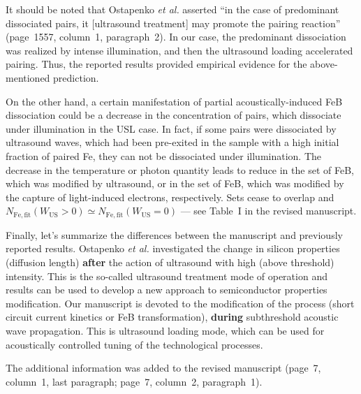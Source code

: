 \documentclass[sn-mathphys]{sn-jnl}
\begin{document}
It should be noted that Ostapenko \emph{et al.}\cite{Ostapenko1994APL} asserted
``in the  case  of predominant  dissociated  pairs,  it [ultrasound treatment] may promote  the
pairing reaction'' (page~1557, column~1, paragraph~2).
In our case, the predominant  dissociation was realized by intense illumination, and then
the ultrasound loading accelerated pairing.
Thus, the reported results provided empirical evidence  for the above-mentioned prediction.


On the other hand, a certain manifestation of partial acoustically-induced FeB dissociation could be
a decrease in the concentration of pairs, which dissociate under illumination in the USL case.
In fact, if some pairs were dissociated by  ultrasound waves, which had been pre-exited
in the sample with a high initial  fraction of paired Fe,
they can not be dissociated under illumination.
The decrease in the temperature   or photon quantity leads to reduce in the set of FeB, which was modified by ultrasound, or in the set of FeB,
which was modified by the capture of light-induced electrons, respectively.
Sets cease to overlap and $N_\mathrm{Fe,fit}(W_\mathrm{US}>0)\simeq N_\mathrm{Fe,fit}(W_\mathrm{US}=0)$ --- see Table~I in the revised manuscript.


Finally, let's summarize the differences between the manuscript and previously reported results.
Ostapenko \emph{et al.}\cite{Ostapenko1995,Ostapenko1994APL,Ostapenko1995SST}
investigated the change in silicon properties (diffusion length) \textbf{after}
the action of ultrasound with high (above threshold) intensity.
This is the so-called ultrasound treatment mode of operation
and results  can be used to develop a new approach to semiconductor properties modification.
Our manuscript is devoted to the modification of the process
(short circuit current kinetics or FeB transformation),
\textbf{during} subthreshold acoustic wave propagation.
This is ultrasound loading mode,
which can be used for acoustically controlled tuning of the technological processes.

The additional information was added to the revised manuscript
(page~7, column~1, last paragraph; page~7, column~2, paragraph~1).


\end{document}
